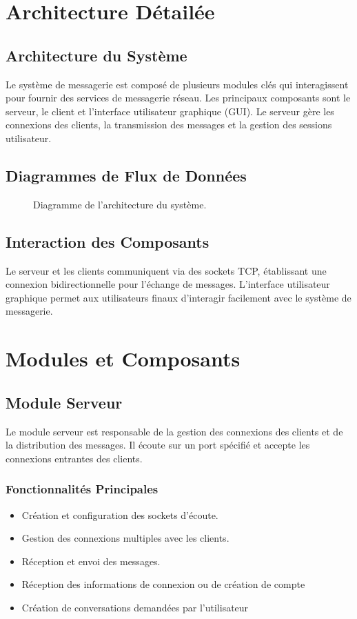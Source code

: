 \documentclass{article}
\begin{document}
\section{Architecture Détailée}
\subsection{Architecture du Système}
Le système de messagerie est composé de plusieurs modules clés qui interagissent pour fournir des services de messagerie réseau. Les principaux composants sont le serveur, le client et l'interface utilisateur graphique (GUI). Le serveur gère les connexions des clients, la transmission des messages et la gestion des sessions utilisateur.

\subsection{Diagrammes de Flux de Données}
\begin{figure}[H]
\centering
\caption{Diagramme de l'architecture du système.}
\label{fig:architecture}
\end{figure}

\subsection{Interaction des Composants}
Le serveur et les clients communiquent via des sockets TCP, établissant une connexion bidirectionnelle pour l'échange de messages. L'interface utilisateur graphique permet aux utilisateurs finaux d'interagir facilement avec le système de messagerie.

\section{Modules et Composants}
\subsection{Module Serveur}
Le module serveur est responsable de la gestion des connexions des clients et de la distribution des messages. Il écoute sur un port spécifié et accepte les connexions entrantes des clients.

\subsubsection{Fonctionnalités Principales}
\begin{itemize}
    \item Création et configuration des sockets d'écoute.
    \item Gestion des connexions multiples avec les clients.
    \item Réception et envoi des messages.
    \item Réception des informations de connexion ou de création de compte
    \item Création de conversations demandées par l'utilisateur
\end{itemize}
\end{document}
